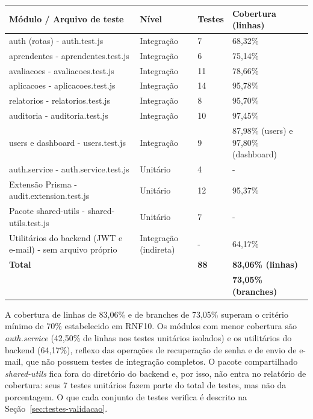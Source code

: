 \begin{quadro}[H]
\centering
\small
\caption{Distribuição dos testes e cobertura por módulo do backend}
\begin{tabular}{p{5cm} p{2.2cm} p{2.5cm} p{2.5cm}}
\hline
\textbf{Módulo / Arquivo de teste} & \textbf{Nível} & \textbf{Testes} & \textbf{Cobertura (linhas)} \\
\hline
auth (rotas) - auth.test.js & Integração & 7 & 68,32\% \\
aprendentes - aprendentes.test.js & Integração & 6 & 75,14\% \\
avaliacoes - avaliacoes.test.js & Integração & 11 & 78,66\% \\
aplicacoes - aplicacoes.test.js & Integração & 14 & 95,78\% \\
relatorios - relatorios.test.js & Integração & 8 & 95,70\% \\
auditoria - auditoria.test.js & Integração & 10 & 97,45\% \\
users e dashboard - users.test.js & Integração & 9 & 87,98\% (users) e 97,80\% (dashboard) \\
auth.service - auth.service.test.js & Unitário & 4 & - \\
Extensão Prisma - audit.extension.test.js & Unitário & 12 & 95,37\% \\
Pacote shared-utils - shared-utils.test.js & Unitário & 7 & - \\
Utilitários do backend (JWT e e-mail) - sem arquivo próprio & Integração (indireta) & - & 64,17\% \\
\hline
\textbf{Total} & & \textbf{88} & \textbf{83,06\% (linhas)} \\
 & & & \textbf{73,05\% (branches)} \\
\hline
\end{tabular}
\label{qua:testes_backend}
\end{quadro}

A cobertura de linhas de 83,06\% e de branches de 73,05\% superam o critério mínimo de 70\% estabelecido em RNF10. Os módulos com menor cobertura são \textit{auth.service} (42,50\% de linhas nos testes unitários isolados) e os utilitários do backend (64,17\%), reflexo das operações de recuperação de senha e de envio de e-mail, que não possuem testes de integração completos. O pacote compartilhado \textit{shared-utils} fica fora do diretório do backend e, por isso, não entra no relatório de cobertura: seus 7 testes unitários fazem parte do total de testes, mas não da porcentagem. O que cada conjunto de testes verifica é descrito na Seção~\ref{sec:testes-validacao}.

